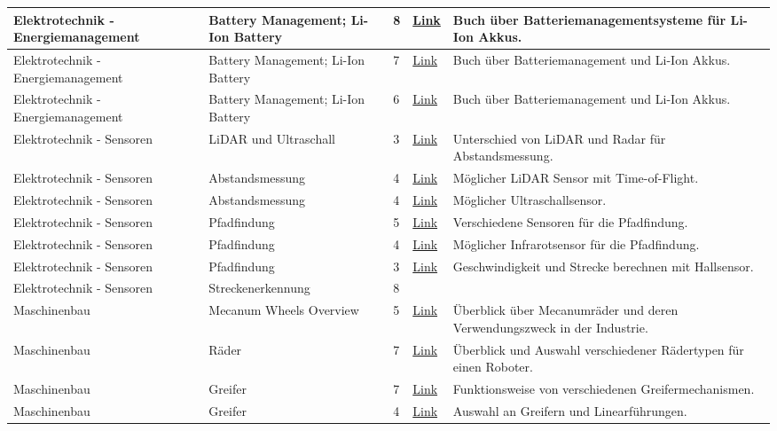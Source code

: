 \documentclass[main.tex]{subfiles} %
\begin{document}
\begin{longtable}{@{} L{2.5cm} L{2.9cm} C{1cm} L{1.2cm} L{6cm} @{}}
Elektrotechnik - Energiemanagement & Battery Management; Li-Ion Battery & 8 & \href{https://learning.oreilly.com/library/view/battery-management-system/9781119154006/}{Link} & Buch über Batteriemanagementsysteme für Li-Ion Akkus. \\
\hline
Elektrotechnik - Energiemanagement & Battery Management; Li-Ion Battery & 7 & \href{https://app.knovel.com/kn/resources/kpSALIBM02/toc}{Link} & Buch über Batteriemanagement und Li-Ion Akkus. \\
\hline
Elektrotechnik - Energiemanagement & Battery Management; Li-Ion Battery & 6 & \href{https://app.knovel.com/kn/resources/kpBMSLLIB4/toc}{Link} & Buch über Batteriemanagement und Li-Ion Akkus. \\
\hline
Elektrotechnik - Sensoren & LiDAR und Ultraschall & 3 & \href{https://www.carwow.de/automagazin/auto-lexikon/auto-technologie/lidar-sensor-auto}{Link} & Unterschied von LiDAR und Radar für Abstandsmessung. \\
\hline
Elektrotechnik - Sensoren & Abstandsmessung & 4 & \href{https://ch.farnell.com/dfrobot/sen0259/laser-entfernungssensor-lidar/dp/3769959?cfm=true}{Link} & Möglicher LiDAR Sensor mit Time-of-Flight. \\
\hline
Elektrotechnik - Sensoren & Abstandsmessung & 4 & \href{https://www.az-delivery.de/products/3er-set-hc-sr04-ultraschallmodule}{Link} & Möglicher Ultraschallsensor. \\
\hline
Elektrotechnik - Sensoren & Pfadfindung & 5 & \href{https://intorobotics.com/types-of-sensors-for-target-detection-and-tracking/}{Link} & Verschiedene Sensoren für die Pfadfindung. \\
\hline
Elektrotechnik - Sensoren & Pfadfindung & 4 & \href{https://www.az-delivery.de/products/linienfolger-modul-mit-tcrt5000-und-analog-ausgang}{Link} & Möglicher Infrarotsensor für die Pfadfindung. \\
\hline
Elektrotechnik - Sensoren & Pfadfindung & 3 & \href{https://kiranjoy.blog/2018/08/19/calculate-speed-using-hall-effect-sensor/}{Link} & Geschwindigkeit und Strecke berechnen mit Hallsensor. \\
\hline
Elektrotechnik - Sensoren & Streckenerkennung & 8 & & \\
\hline
Maschinenbau & Mecanum Wheels Overview & 5 & \href{https://intapi.sciendo.com/pdf/10.2478/kbo-2022-0086}{Link} & Überblick über Mecanumräder und deren Verwendungszweck in der Industrie. \\
\hline
Maschinenbau & Räder & 7 & \href{https://www.quasi.ai/choosing-the-right-robotic-wheels-for-your-amr/}{Link} & Überblick und Auswahl verschiedener Rädertypen für einen Roboter. \\
\hline
Maschinenbau & Greifer & 7 & \href{https://qviro.com/blog/introduction-grippers/}{Link} & Funktionsweise von verschiedenen Greifermechanismen. \\
\hline
Maschinenbau & Greifer & 4 & \href{https://www.freise-automation.de/produkte/greifer-handhabungstechnik/}{Link} & Auswahl an Greifern und Linearführungen. \\


\end{longtable}
\end{document}
